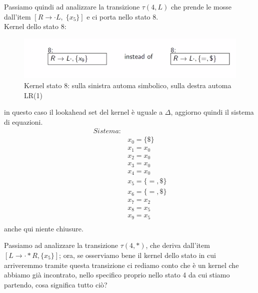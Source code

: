 \documentclass[class=book, crop=false, oneside, 12pt]{standalone}
\begin{document}
Passiamo quindi ad analizzare la transizione \(\tau(4, L)\) che prende le mosse dall'item \([R \to \cdot L, \; \{x_5\}]\) e ci porta nello stato 8.
\\
Kernel dello stato 8:
\begin{figure}
    \centering
    \includegraphics[width=.7\textwidth]{ex_automa_simbolico-kernel_s8.png}
    \caption{Kernel stato 8: sulla sinistra automa simbolico, sulla destra automa LR(1)}
\end{figure}
in questo caso il lookahead set del kernel è uguale a \(\Delta\), aggiorno quindi il sistema di equazioni.
\begin{align*}
    Sistema:& \\
            & x_0 = \{\$\} \\
            & x_1 = x_0 \\
            & x_2 = x_0 \\
            & x_3 = x_0 \\
            & x_4 = x_0 \\
            & x_5 = \{=, \$\} \\
            & x_6 = \{=, \$\} \\
            & x_7 = x_2 \\
            & x_8 = x_5 \\
            & x_9 = x_5 \\
\end{align*}
anche qui niente chiusure.

Passiamo ad analizzare la transizione \(\tau(4,*)\), che deriva dall'item \([L \to \cdot * R, \{x_5\}]\); ora, se osserviamo bene il kernel dello stato in cui arriveremmo tramite questa transizione ci rediamo conto che è un kernel che abbiamo già incontrato, nello specifico proprio nello stato 4 da cui stiamo partendo, cosa significa tutto ciò?
\end{document}
